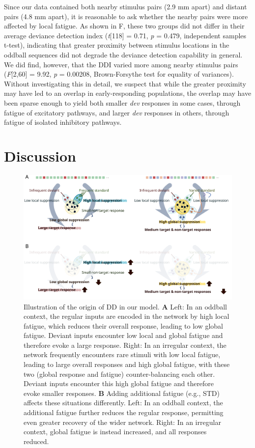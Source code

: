 \documentclass[9pt,lineno,onehalfspacing]{elife}
\newcommand{\dev}{\textit{dev}}
\begin{document}
Since our data contained both nearby stimulus pairs (2.9 mm apart) and distant pairs (4.8 mm apart), it is reasonable to ask whether the nearby pairs were more affected by local fatigue. As shown in F, these two groups did not differ in their average deviance detection index (\textit{t}[118] = 0.71, \textit{p} = 0.479, independent samples t-test), indicating that greater proximity between stimulus locations in the oddball sequences did not degrade the deviance detection capability in general. We did find, however, that the DDI varied more among nearby stimulus pairs (\textit{F}[2,60] = 9.92, \textit{p} = 0.00208, Brown-Forsythe test for equality of variances). Without investigating this in detail, we suspect that while the greater proximity may have led to an overlap in early-responding populations, the overlap may have been sparse enough to yield both smaller \dev{} responses in some cases, through fatigue of excitatory pathways, and larger \dev{} responses in others, through fatigue of isolated inhibitory pathways.

\section{Discussion}\label{sec:discussion}

\begin{figure}
    \includegraphics[width=\linewidth]{fig-conclusion}
    \caption{%
        Illustration of the origin of DD in our model.
        \textbf{A} Left: In an oddball context, the regular inputs are encoded in the network by high local fatigue, which reduces their overall response, leading to low global fatigue. Deviant inputs encounter low local and global fatigue and therefore evoke a large response. Right: In an irregular context, the network frequently encounters rare stimuli with low local fatigue, leading to large overall responses and high global fatigue, with these two (global response and fatigue) counter-balancing each other. Deviant inputs encounter this high global fatigue and therefore evoke smaller responses.
        \textbf{B} Adding additional fatigue (e.g., STD) affects these situations differently. Left: In an oddball context, the additional fatigue further reduces the regular response, permitting even greater recovery of the wider network. Right: In an irregular context, global fatigue is instead increased, and all responses reduced.
    }
    \label{fig:conclusion}
\end{figure}
\end{document}
